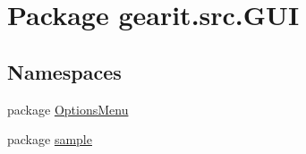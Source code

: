 \hypertarget{namespacegearit_1_1src_1_1_g_u_i}{\section{Package gearit.\+src.\+G\+U\+I}
\label{namespacegearit_1_1src_1_1_g_u_i}
}
\subsection*{Namespaces}
\begin{DoxyCompactItemize}
\item 
package \hyperlink{namespacegearit_1_1src_1_1_g_u_i_1_1_options_menu}{Options\+Menu}
\item 
package \hyperlink{namespacegearit_1_1src_1_1_g_u_i_1_1sample}{sample}
\end{DoxyCompactItemize}
